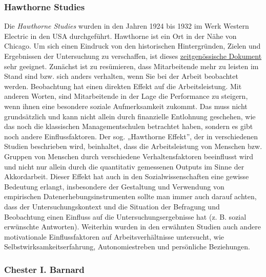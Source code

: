 \documentclass[
  letterpaper,
]{book}
\begin{document}
\subsubsection{Hawthorne Studies}\label{hawthorne-studies}

Die \emph{Hawthorne Studies} wurden in den Jahren 1924 bis 1932 im Werk
Western Electric in den USA durchgeführt. Hawthorne ist ein Ort in der
Nähe von Chicago. Um sich einen Eindruck von den historischen
Hintergründen, Zielen und Ergebnissen der Untersuchung zu verschaffen,
ist dieses \href{https://youtu.be/W7RHjwmVGhs}{zeitgenössische Dokument}
sehr geeignet. Zunächst ist zu resümieren, dass Mitarbeitende mehr zu
leisten im Stand sind bzw. sich anders verhalten, wenn Sie bei der
Arbeit beobachtet werden. Beobachtung hat einen direkten Effekt auf die
Arbeitsleistung. Mit anderen Worten, sind Mitarbeitende in der Lage die
Performance zu steigern, wenn ihnen eine besondere soziale
Aufmerksamkeit zukommt. Das muss nicht grundsätzlich und kann nicht
allein durch finanzielle Entlohnung geschehen, wie das noch die
klassischen Managementschulen betrachtet haben, sondern es gibt noch
andere Einflussfaktoren. Der sog. „Hawthorne Effekt'', der in
verschiedenen Studien beschrieben wird, beinhaltet, dass die
Arbeitsleistung von Menschen bzw. Gruppen von Menschen durch
verschiedene Verhaltensfaktoren beeinflusst wird und nicht nur allein
durch die quantitativ gemessenen Outputs im Sinne der Akkordarbeit.
Dieser Effekt hat auch in den Sozialwissenschaften eine gewisse
Bedeutung erlangt, insbesondere der Gestaltung und Verwendung von
empirischen Datenerhebungsinstrumenten sollte man immer auch darauf
achten, dass der Untersuchungskontext und die Situation der Befragung
und Beobachtung einen Einfluss auf die Untersuchungsergebnisse hat (z.
B. sozial erwünschte Antworten). Weiterhin wurden in den erwähnten
Studien auch andere motivationale Einflussfaktoren auf
Arbeitsverhältnisse untersucht, wie Selbstwirksamkeitserfahrung,
Autonomiestreben und persönliche Beziehungen.

\subsubsection{Chester I. Barnard}\label{chester-i.-barnard}
\end{document}
